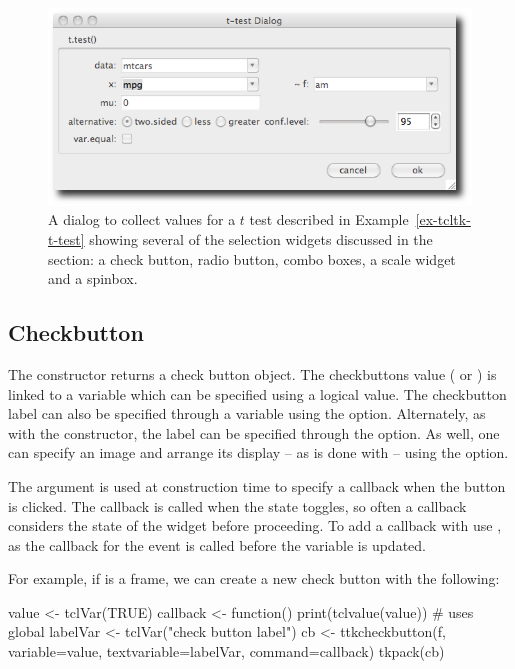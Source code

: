 \begin{figure}
  \centering
  \includegraphics[width=.75\textwidth]{fig-tcltk-t-test.png}
  \caption{A dialog to collect values for a $t$ test described in
    Example~\ref{ex-tcltk-t-test} showing several of the selection
    widgets discussed in the section: a check button, radio button,
    combo boxes, a scale widget and a spinbox.}
  \label{fig:fig-tcltk-t-test}
\end{figure}

\subsection{Checkbutton}
\label{sec:tcltk:checkboxes}

The  constructor returns a check button
object. The checkbuttons value ( or ) is linked
to a \TCL\/ variable which can be specified using a logical value.
The checkbutton label can also be specified through a \TCL\/ variable
using the  option.  Alternately,
as with the  constructor, the label can be specified
through the  option. As well, one can
specify an image and arrange its display -- as is done with
 -- using the 
option.

The  argument is used at construction
time to specify a callback when the button is clicked. The callback is
called when the state toggles, so often a callback considers the state
of the widget before proceeding.  To add a callback with
 use , as the callback
for the event  is called before the variable is
updated.

For example, if  is a frame, we can create a new check button
with the following:

\begin{Schunk}
\begin{Sinput}
 value <- tclVar(TRUE)
 callback <- function() print(tclvalue(value))   # uses global
 labelVar <- tclVar("check button label")
 cb <- ttkcheckbutton(f, variable=value, 
                      textvariable=labelVar, command=callback)
 tkpack(cb)
\end{Sinput}
\end{Schunk}

